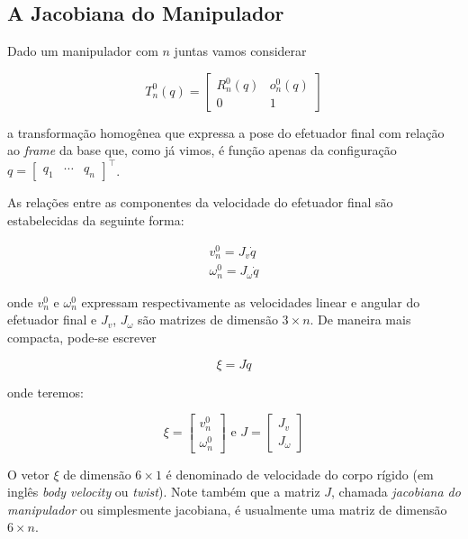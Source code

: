 \subsection{A Jacobiana do Manipulador}

Dado um manipulador com $n$ juntas vamos considerar

\begin{equation}
    T_{n}^{0}(q) = \begin{bmatrix}
        R_{n}^{0}(q) & o_{n}^{0}(q) \\
        0            & 1
    \end{bmatrix}
\end{equation}

a transformação homogênea que expressa a pose do efetuador final com relação ao
\emph{frame} da base que, como já vimos, é função apenas da configuração \(q =
\begin{bmatrix}
    q_1 & \cdots & q_n
\end{bmatrix}^\top\).

As relações entre as componentes da velocidade do efetuador final
são estabelecidas da seguinte forma:

\begin{align}
    v_n^0 = J_v \dot{q} \\
    \omega_n^0 = J_\omega \dot{q}
\end{align}

onde \(v_n^0\) e \(\omega_n^0\) expressam respectivamente as velocidades linear
e angular do efetuador final e \(J_v\), \(J_\omega\) são matrizes de dimensão
\(3 \times n\). De maneira mais compacta, pode-se escrever

\begin{equation}
    \xi = J \dot{q}
\end{equation}

onde teremos:

\begin{equation}
    \xi = \begin{bmatrix}
        v_n^0 \\
        \omega_n^0
    \end{bmatrix} \text{ e } J = \begin{bmatrix}
        J_v \\
        J_\omega
    \end{bmatrix}
\end{equation}

O vetor \(\xi\) de dimensão \(6 \times 1\) é denominado de velocidade do corpo
rígido (em inglês \emph{body velocity} ou \emph{twist}). Note também que a
matriz \(J\), chamada \emph{jacobiana do manipulador} ou simplesmente
jacobiana, é usualmente uma matriz de dimensão \(6 \times n\).


